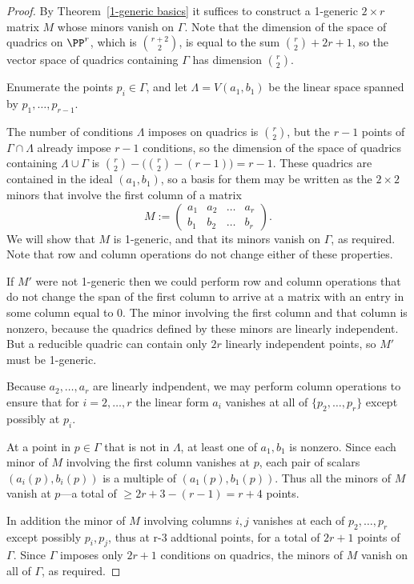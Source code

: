 \begin{proof}
By Theorem~\ref{1-generic basics} it suffices to construct a 1-generic $2\times r$ matrix $M$ whose minors vanish on
$\Gamma$. Note that the dimension of the space of quadrics on $\PP^r$, which is $\binom{r+2}{2}$, is equal to the sum
$\binom{r}{2}+2r+1$, so the vector space of quadrics containing $\Gamma$ has dimension $\binom{r}{2}$.

Enumerate the points $p_i\in \Gamma$, and let $\Lambda = V(a_1,b_1)$ be the linear
space spanned by $p_1,\dots,p_{r-1}$. 

 The number of
conditions $\Lambda$ imposes on quadrics is $\binom{r}{2}$, but the $r-1$ points of $\Gamma \cap \Lambda$
already impose $r-1$ conditions, so the dimension of the space of quadrics containing $\Lambda\cup \Gamma$
is $\binom{r}{2}-\bigl(\binom{r}{2}-(r-1)\bigr) = r-1.$ These quadrics are contained in the ideal $(a_1,b_1)$, so a
basis for them
may be written as the $2\times 2$ minors that involve the first column of a matrix
$$
M := \begin{pmatrix}
a_1&a_2&\dots&a_{r}\\
b_1&b_2&\dots&b_{r}
\end{pmatrix}.
$$
We will show that $M$ is 1-generic, and that its minors vanish on $\Gamma$, as required.
Note that row and column operations do not change either of these properties.

If $M'$ were not 1-generic then we could perform row and column operations that do not change the 
span of the first column to arrive at a matrix with an entry in some column equal to 0. The minor
involving the first column and that column is nonzero, because the quadrics defined by
these minors are linearly independent. But a reducible quadric can contain
only $2r$ linearly independent points, so $M'$ must be 1-generic.

Because $a_2,\dots, a_r$ are linearly indpendent,
we may perform column operations to ensure that for $i=2, \dots, r$ the linear form
$a_i$ vanishes at all of $\{p_2,\dots, p_{r}\}$ except possibly at $p_i$.

At a point in $p\in \Gamma$ that is not in $\Lambda$, at least one of $a_1,b_1$ is nonzero.
Since each minor
of $M$ involving the first column vanishes at $p$, each pair
of scalars $(a_i(p),b_i(p))$ is a multiple of $(a_1(p), b_1(p))$. Thus all the minors
of $M$ vanish at $p$---a total of $\geq 2r+3-(r-1) = r+4$ points.

In addition the minor of $M$ involving columns $i,j$ vanishes at each of $p_2,\dots, p_r$ except possibly
$p_i,p_j$, thus at r-3 addtional points, for a total of $2r+1$ points of $\Gamma$. Since
$\Gamma$ imposes only $2r+1$ conditions on quadrics, the minors of $M$ vanish on all of $\Gamma$,
as required. 
\end{proof}

